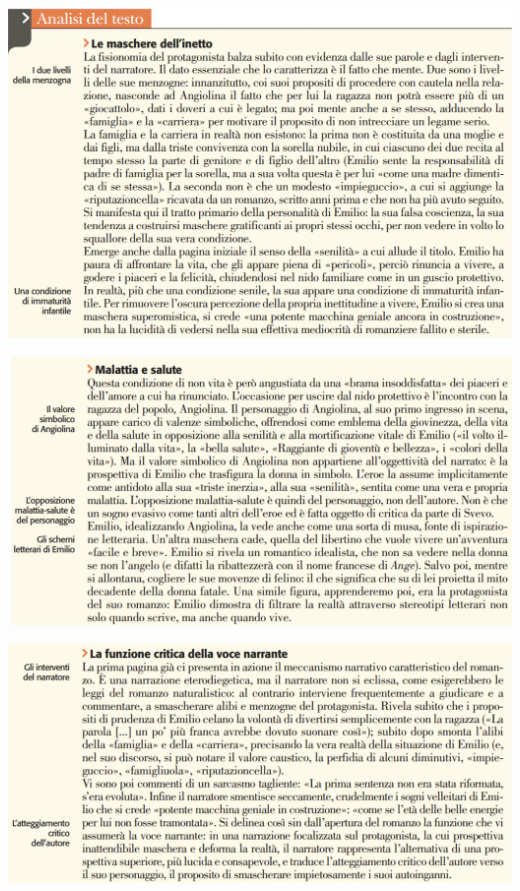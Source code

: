 \documentclass[a4paper, twoside, titlepage]{book}
\begin{document}
\vfill
\begin{center}
\includegraphics[width=\textwidth]{inetto1}
\end{center}

\begin{center}
\includegraphics[width=\textwidth]{inetto2}
\end{center}

\begin{center}
\includegraphics[width=\textwidth]{inetto3}
\end{center}
\end{document}
